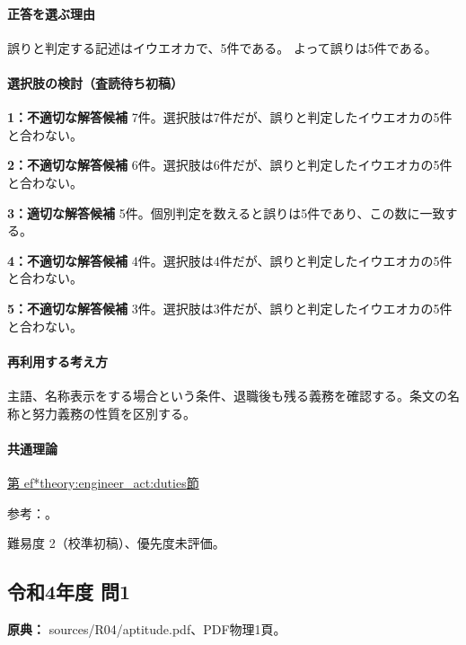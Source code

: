 \paragraph{正答を選ぶ理由} 誤りと判定する記述はイウエオカで、5件である。  よって誤りは5件である。

\paragraph{選択肢の検討（査読待ち初稿）}

\noindent\textbf{1：不適切な解答候補} 7件。選択肢は7件だが、誤りと判定したイウエオカの5件と合わない。\par

\noindent\textbf{2：不適切な解答候補} 6件。選択肢は6件だが、誤りと判定したイウエオカの5件と合わない。\par

\noindent\textbf{3：適切な解答候補} 5件。個別判定を数えると誤りは5件であり、この数に一致する。\par

\noindent\textbf{4：不適切な解答候補} 4件。選択肢は4件だが、誤りと判定したイウエオカの5件と合わない。\par

\noindent\textbf{5：不適切な解答候補} 3件。選択肢は3件だが、誤りと判定したイウエオカの5件と合わない。\par

\paragraph{再利用する考え方} 主語、名称表示をする場合という条件、退職後も残る義務を確認する。条文の名称と努力義務の性質を区別する。

\paragraph{共通理論} \hyperref[theory:engineer_act:duties]{第
ef*{theory:engineer_act:duties}節}

\par 参考：\cite{engineer_act_current}。

\par 難易度 2（校準初稿）、優先度未評価。

\subsection{令和4年度 問1}
\label{q:r04-reg-apt-01}

\noindent\textbf{原典：} sources/R04/aptitude.pdf、PDF物理1頁。

